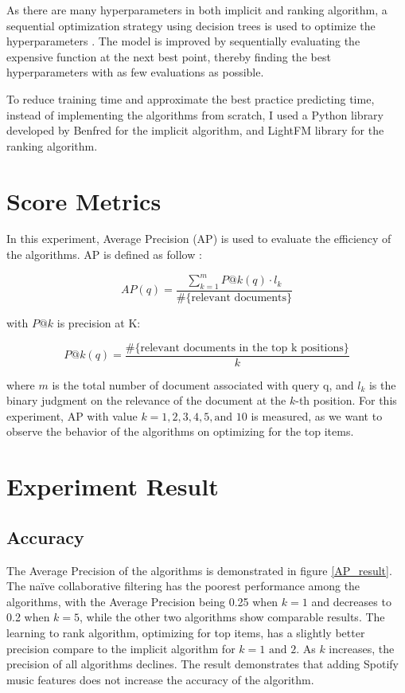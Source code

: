 As there are many hyperparameters in both implicit and ranking algorithm, a sequential optimization strategy using decision trees is used to optimize the hyperparameters \cite{ForestMinimize2018}. The model is improved by sequentially evaluating the expensive function at the next best point, thereby finding the best hyperparameters with as few evaluations as possible. 

To reduce training time and approximate the best practice predicting time, instead of implementing the algorithms from scratch, I used a Python library developed by Benfred \cite{Benfred2018} for the implicit algorithm, and LightFM library \cite{DBLP:conf/recsys/Kula15} for the ranking algorithm.

\section{Score Metrics}
In this experiment, Average Precision (AP) is used to evaluate the efficiency of the algorithms. AP is defined as follow \cite{liu2009learning}:

\begin{displaymath}
AP(q) = \frac{\sum_{k=1}^m P@k(q) \cdot l_k}{\#\text{\{relevant documents\}}}
\end{displaymath}

\noindent with \( P@k \) is precision at K:

\begin{displaymath}
P@k(q) = \frac{\#\text{\{relevant documents in the top k positions\}}}{k}
\end{displaymath}

\noindent where \(m\) is the total number of document associated with query q, and \(l_k\) is the binary judgment on the relevance of the document at the \(k\)-th position. For this experiment, AP with value \(k = 1, 2, 3, 4, 5, \text{and } 10\) is measured, as we want to observe the behavior of the algorithms on optimizing for the top items. 

\section{Experiment Result}
\subsection{Accuracy}
The Average Precision of the algorithms is demonstrated in figure \ref{AP_result}. The na\"ive collaborative filtering has the poorest performance among the algorithms, with the Average Precision being 0.25 when \(k = 1\) and decreases to 0.2 when \(k = 5\), while the other two algorithms show comparable results. The learning to rank algorithm, optimizing for top items, has a slightly better precision compare to the implicit algorithm for \(k = 1 \text{ and } 2\). As \(k\) increases, the precision of all algorithms declines. The result demonstrates that adding Spotify music features does not increase the accuracy of the algorithm. 

